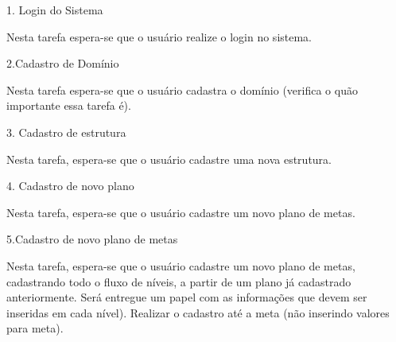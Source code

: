 \label{cap:apendice}

1. Login do Sistema

Nesta tarefa espera-se que o usuário realize o login no sistema.

2.Cadastro de Domínio

Nesta tarefa espera-se que o usuário cadastra o domínio (verifica o quão importante essa tarefa é).

3. Cadastro de estrutura

Nesta tarefa, espera-se que o usuário cadastre uma nova estrutura.

4. Cadastro de novo plano

Nesta tarefa, espera-se que o usuário cadastre um novo plano de metas. 

5.Cadastro de novo plano de metas

Nesta tarefa, espera-se que o usuário cadastre um novo plano de metas, cadastrando todo o fluxo de níveis,  a partir de um plano já cadastrado anteriormente. Será entregue um papel com as informações que devem ser inseridas em cada nível). Realizar o cadastro até a meta (não inserindo valores para meta).